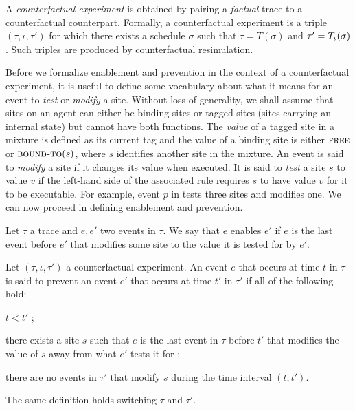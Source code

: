 A \textit{counterfactual experiment} is obtained by pairing a
\emph{factual} trace to a counterfactual counterpart. Formally, a
counterfactual experiment is a triple $(\tau, \iota, \tau')$ for which
there exists a schedule $\sigma$ such that $\tau = T(\sigma)$ and
$\tau' = {T_\iota}{}(\sigma)$. Such triples are produced by
counterfactual resimulation.

Before we formalize enablement and prevention in the context of a
counterfactual experiment, it is useful to define some vocabulary
about what it means for an event to \emph{test} or \emph{modify} a
site. Without loss of generality, we shall assume that sites on an
agent can either be binding sites or tagged sites (sites carrying an
internal state) but cannot have both functions. The \textit{value} of
a tagged site in a mixture is defined as its current tag and the value
of a binding site is either $\textsc{free}$ or $\textsc{bound-to}(s)$,
where $s$ identifies another site in the mixture.  An event is said to
\emph{modify} a site if it changes its value when executed. It is said
to \emph{test} a site $s$ to value $v$ if the left-hand side of the
associated rule requires $s$ to have value $v$ for it to be
executable. For example, event $p$ in \RefTrace{} tests three sites
and modifies one. We can now proceed in defining enablement and
prevention.



\begin{definition}[Enablement]
  Let $\tau$ a trace and $e, e'$ two events in $\tau$.  We say that
  $e$ enables $e'$ if $e$ is the last event before $e'$ that modifies
  some site to the value it is tested for by $e'$.
\end{definition}

\begin{definition}[Prevention]
  Let $(\tau, \iota, \tau')$ a counterfactual experiment. An event $e$
  that occurs at time $t$ in $\tau$ is said to prevent an event $e'$
  that occurs at time $t'$ in $\tau'$ if all of the following hold:
  \begin{inparaenum}[(1)]
  \item \label{inhibition:time} $t < t'$ ;
  \item \label{inhibition:breaks} there exists a site $s$ such that
    $e$ is the last event in $\tau$ before $t'$ that modifies the
    value of $s$ away from what $e'$ tests it for ;
  \item \label{inhibition:nointf} there are no events in $\tau'$ that
    modify $s$ during the time interval $(t, t')$.
  \end{inparaenum}
  The same definition holds switching $\tau$ and $\tau'$.
\end{definition}

